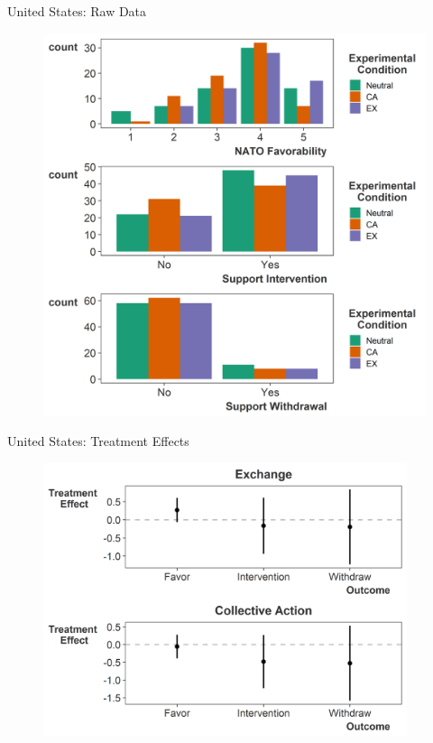\documentclass[12pt]{beamer}
\begin{document}


\begin{frame}{United States: Raw Data}

\begin{figure}[htbp]
	\centering
		\includegraphics[height=.95\textheight]{raw-us-pres.png}
\end{figure}


\end{frame}


\begin{frame}{United States: Treatment Effects}

\pause 

\begin{figure}[htbp]
	\centering
		\includegraphics[width=0.95\textwidth]{us-te-pres.png}
\end{figure}


\end{frame}
\end{document}
